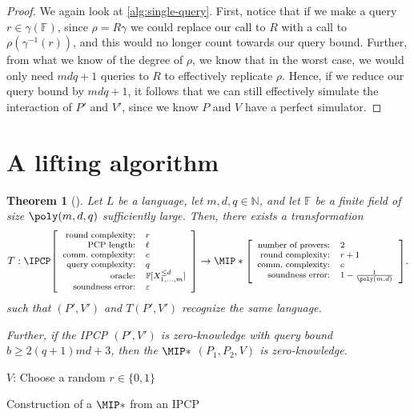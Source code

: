 \documentclass[english,12pt]{reedthesis}
\theoremstyle{plain}
\newtheorem{thm}{Theorem}[section]
\theoremstyle{definition}
\theoremstyle{remark}
\newcommand{\ldipcp}[6]{%
  \ensuremath%
  \mleft[{\footnotesize\begin{array}{r l}
    \text{round complexity:} & #1 \\
    \text{PCP length:} & #2 \\
    \text{comm.\ complexity:} & #3 \\
    \text{query complexity:} & #4 \\
    \text{oracle:} & #5 \\
    \text{soundness error:} & #6
  \end{array}}\mright]%
}
\newcommand{\mipstar}[4]{%
  \ensuremath%
  \mleft[{\footnotesize\begin{array}{r l}
    \text{number of provers:} & #1 \\
    \text{round complexity:} & #2 \\
    \text{comm.\ complexity:} & #3 \\
    \text{soundness error:} & #4
  \end{array}}\mright]%
}
\begin{document}
\begin{proof}
  We again look at \cref{alg:single-query}. First, notice that if we make a
  query $r \in \gamma(\mathbb{F})$, since $\rho = R\gamma$ we could replace our call to $R$
  with a call to $\rho(\gamma^{-1}(r))$, and this would no longer count towards our
  query bound. Further, from what we know of the degree of $\rho$, we know that in
  the worst case, we would only need $mdq + 1$ queries to $R$ to effectively
  replicate $\rho$. Hence, if we reduce our query bound by $mdq + 1$, it follows
  that we can still effectively simulate the interaction of $P'$ and $V'$, since
  we know $P$ and $V$ have a perfect simulator.
\end{proof}

\section{A lifting algorithm}

\begin{thm}[{\cite[Lemma 9.1]{CFGS22}}]\label{thm:lift-ipcp-mip}
  Let $L$ be a language, let $m, d, q \in \mathbb{N}$, and let $\mathbb{F}$ be a finite
  field of size $\poly(m, d, q)$ sufficiently large. Then, there exists a
  transformation
  \begin{equation*}
    T: \IPCP\ldipcp{r}{\ell}{c}{q}{\mathbb{F}[X_{1, \ldots, m}^{\le d}]}{\varepsilon}
    \rightarrow \MIP*\mipstar{2}{r+1}{c}{1 - \frac{1}{\poly(m, d)}}.
  \end{equation*}
  such that $(P', V')$ and $T(P', V')$ recognize the same language.

  Further, if the IPCP $(P', V')$ is zero-knowledge with query bound
  $b \ge 2(q+1)md + 3$, then the $\MIP*$ $(P_{1}, P_{2}, V)$ is zero-knowledge.
\end{thm}

\begin{algorithm}[htbp]
  $V$: Choose a random $r \in \{0, 1\}$\;
  \caption{Construction of a $\MIP*$ from an IPCP~\cite[Construction 2]{CFGS22}}\label{alg:mip-from-ipcp}
\end{algorithm}
\end{document}
